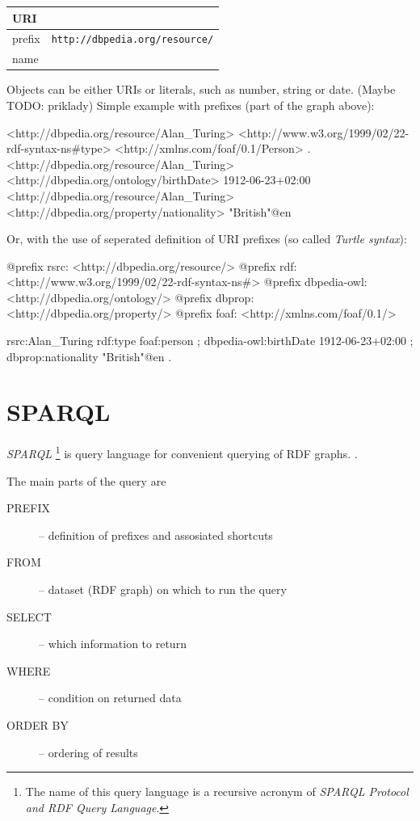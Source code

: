 \documentclass[a4paper, 12pt, twoside]{fithesis2}		%
\renewcommand{\_}{\leavevmode \kern0.0em\vbox{\hrule width0.4em}}
\begin{document}
\begin{tabular}{ l  l }
  URI & \texttt{http://dbpedia.org/resource/Alan\_Turing}\\
  \hline
  prefix & \texttt{http://dbpedia.org/resource/}\\
  name & \texttt{Alan\_Turing}\\
\end{tabular}

\noindent
Objects can be either URIs or literals, such as number, string or date. (Maybe TODO: priklady)
Simple example with prefixes (part of the graph above):

\begin{code}
<http://dbpedia.org/resource/Alan_Turing>
    <http://www.w3.org/1999/02/22-rdf-syntax-ns#type>
    <http://xmlns.com/foaf/0.1/Person> .
<http://dbpedia.org/resource/Alan_Turing>
    <http://dbpedia.org/ontology/birthDate>
    1912-06-23+02:00
<http://dbpedia.org/resource/Alan_Turing>
   <http://dbpedia.org/property/nationality>
   "British"@en
\end{code}

Or, with the use of seperated definition of URI prefixes (so called \emph{Turtle syntax}):

\begin{code}
@prefix rsrc: <http://dbpedia.org/resource/>
@prefix rdf: <http://www.w3.org/1999/02/22-rdf-syntax-ns#>
@prefix dbpedia-owl: <http://dbpedia.org/ontology/>
@prefix dbprop: <http://dbpedia.org/property/>
@prefix foaf: <http://xmlns.com/foaf/0.1/>

rsrc:Alan_Turing
  rdf:type foaf:person ;
  dbpedia-owl:birthDate 1912-06-23+02:00 ;
  dbprop:nationality "British"@en .
\end{code}

\section{SPARQL}
\label{sec:sparql}

\textit{SPARQL}%
\footnote{The name of this query language is a recursive acronym of \textit{SPARQL Protocol and RDF Query Language}.}
is query language for convenient querying of RDF graphs. \parencite[][84]{semantic-web}.

The main parts of the query are
\begin{description}
  \item[PREFIX] -- definition of prefixes and assosiated shortcuts
  \item[FROM] -- dataset (RDF graph) on which to run the query
  \item[SELECT] -- which information to return
  \item[WHERE] -- condition on returned data
  \item[ORDER BY] -- ordering of results
\end{description}
\end{document}
